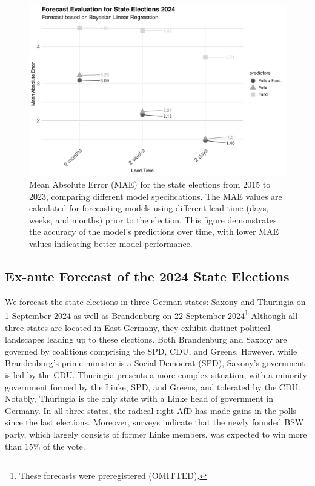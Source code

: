 \documentclass[12pt]{article}
\begin{document}
\begin{doublespacing}
\begin{figure}[t!]
    \centering
    \includegraphics[width=\textwidth]{fg4_fig_eval_bayes_mae-2.pdf}
    \caption{Mean Absolute Error (MAE) for the state elections from 2015 to 2023, comparing different model specifications. The MAE values are calculated for forecasting models using different lead time (days, weeks, and months) prior to the election. This figure demonstrates the accuracy of the model's predictions over time, with lower MAE values indicating better model performance.}
    \label{fig:model-evaluation-mae}
\end{figure}




\subsection{Ex-ante Forecast of the 2024 State Elections}



We forecast the state elections in three German states: Saxony and Thuringia on 1 September 2024 as well as Brandenburg on 22 September 2024\footnote{These forecasts were preregistered (OMITTED).} %
Although all three states are located in East Germany, they exhibit distinct political landscapes leading up to these elections. Both Brandenburg and Saxony are governed by coalitions comprising the SPD, CDU, and Greens. However, while Brandenburg's prime minister is a Social Democrat (SPD), Saxony's government is led by the CDU. Thuringia presents a more complex situation, with a minority government formed by the Linke, SPD, and Greens, and tolerated by the CDU. Notably, Thuringia is the only state with a Linke head of government in Germany. In all three states, the radical-right AfD has made gains in the polls since the last elections. Moreover, surveys indicate that the newly founded BSW party, which largely consists of former Linke members, was expected to win more than 15\% of the vote.


\end{doublespacing}
\end{document}
